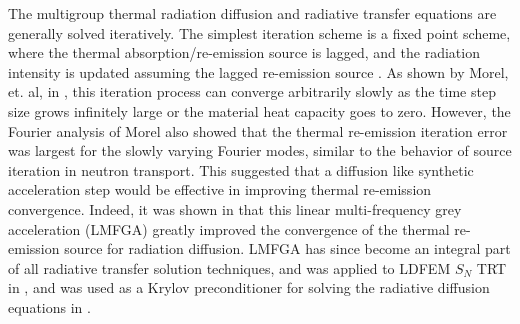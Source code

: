 \documentclass[final,3p,times]{elsarticle}
\begin{document}
The multigroup thermal radiation diffusion and radiative transfer equations are generally solved iteratively.  
The simplest iteration scheme is a fixed point scheme, where the thermal absorption/re-emission source is lagged, and the radiation intensity is updated assuming the lagged re-emission source \cite{first_lmfga}.
As shown by Morel, et. al, in \cite{first_lmfga}, this iteration process can converge arbitrarily slowly as the time step size grows infinitely large or the material heat capacity goes to zero.
However, the Fourier analysis of Morel also showed that the thermal re-emission iteration error was largest for the slowly varying Fourier modes, similar to the behavior of source iteration in neutron transport.
This suggested that a diffusion like synthetic acceleration step would be effective in improving thermal re-emission convergence. 
Indeed, it was shown in \cite{first_lmfga} that this linear multi-frequency grey acceleration (LMFGA) greatly improved the convergence of the thermal re-emission source for radiation diffusion.
LMFGA has since become an integral part of all radiative transfer solution techniques, and was applied to LDFEM $S_N$ TRT in \cite{morel_radtran}, and was used as a Krylov preconditioner for solving the  radiative diffusion equations in \cite{warsa_lmfga}.
\end{document}
